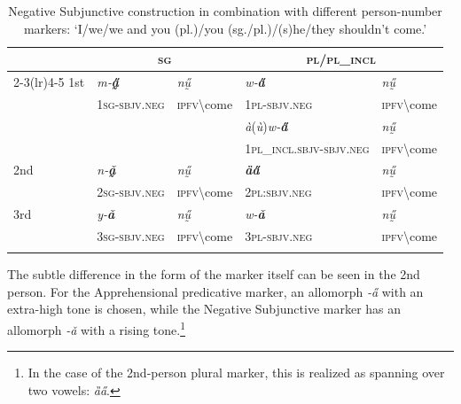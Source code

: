 \documentclass[output=paper,colorlinks,citecolor=brown
]{langscibook}
\begin{document}
\begin{table}

\begin{tabular}{l ll ll}
\lsptoprule
 & \multicolumn{2}{c}{\textsc{sg}} & \multicolumn{2}{c}{\textsc{pl}/\textsc{pl\_incl}} \\ \cmidrule(lr){2-3}\cmidrule(lr){4-5}
1st & \textit{m‑\textbf{a̰̋}}  & \textit{nṵ̋} & \textit{w‑\textbf{a̋}} & \textit{nṵ̋} \\
 & \textsc{1sg-sbjv.neg} & \textsc{ipfv}\backslash come & \textsc{1pl-sbjv.neg} & \textsc{ipfv}\backslash come \\
 &  &  & \textit{à}(\textit{ù})\textit{w‑\textbf{a̋}} & \textit{nṵ̋} \\
 &  &  & \textsc{1pl\_incl.sbjv-sbjv.neg} & \textsc{ipfv}\backslash come \\
\addlinespace
2nd & \textit{n‑\textbf{ǎ̰}} & \textit{nṵ̋} & \textit{\textbf{ȁa̋}} & \textit{nṵ̋} \\
    & \textsc{2sg-sbjv.neg} & \textsc{ipfv}\backslash come & \textsc{2pl:sbjv.neg} & \textsc{ipfv}\backslash come \\
\addlinespace
3rd & \textit{y-\textbf{ǎ}} & \textit{nṵ̋} & \textit{w-\textbf{ǎ}} & \textit{nṵ̋} \\
 & \textsc{3sg-sbjv.neg} & \textsc{ipfv}\backslash come & \textsc{3pl-sbjv.neg} & \textsc{ipfv}\backslash come \\
\lspbottomrule
\end{tabular}
\caption{Negative Subjunctive construction in combination with different person-number markers: `I/we/we and you (pl.)/you (sg./pl.)/(s)he/they shouldn't come.'}
\label{tab2}
\end{table}


The subtle difference in the form of the marker itself can be seen in the 2nd person. For the Apprehensional predicative marker, an allomorph \textit{-a̋} with an extra-high tone is chosen, while the Negative Subjunctive marker has an allomorph \textit{-ǎ} with a rising tone.\footnote{In the case of the 2nd-person plural marker, this is realized as spanning over two vowels: \textit{ȁa̋}.}
\end{document}
